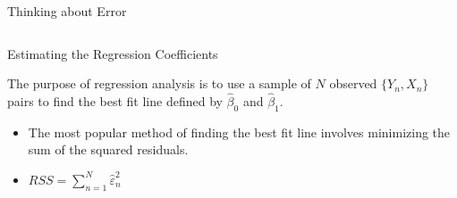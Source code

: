 \documentclass[10pt]{beamer}\usepackage[]{graphicx}\usepackage[]{color}
\makeatletter
\def\maxwidth{ %
  \ifdim\Gin@nat@width>\linewidth
    \linewidth
  \else
    \Gin@nat@width
  \fi
}
\newenvironment{knitrout}{}{} %
\makeatother
\begin{document}
\begin{frame}{Thinking about Error}
\begin{columns}[T]
  \end{columns}

\end{frame}

\watermarkon %

\begin{frame}{Estimating the Regression Coefficients}

  The purpose of regression analysis is to use a sample of $N$ observed $\{Y_n,
  X_n\}$ pairs to find the best fit line defined by $\hat{\beta}_0$ and
  $\hat{\beta}_1$.
  \vb
  \begin{itemize}
  \item The most popular method of finding the best fit line involves minimizing
    the sum of the squared residuals.
    \vb
  \item $RSS = \sum_{n = 1}^N \hat{\varepsilon}_n^2$
  \end{itemize}

\end{frame}
\end{document}
